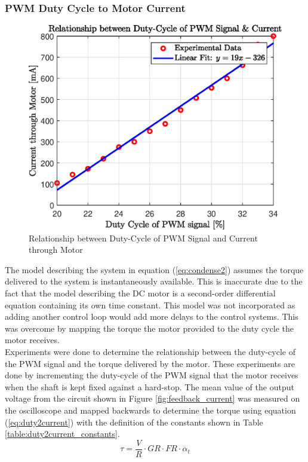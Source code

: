 \subsubsection{ PWM Duty Cycle to Motor Current}

\begin{figure}[h]
	\centering
	\includegraphics[scale=1]{./figs/dutycycle_vs_current.eps}
	\caption{Relationship between Duty-Cycle of PWM Signal and Current through Motor}
	\label{fig:dutycycle_vs_current}
\end{figure}

The model describing the system in equation (\ref{eq:condense2}) assumes the torque delivered to the system is instantaneously available. This is inaccurate due to the fact that the model describing the DC motor is a second-order differential equation containing its own time constant. This model was not incorporated as adding another control loop would add more delays to the control systems. This was overcome by mapping the torque the motor provided to the duty cycle the motor receives.\\

Experiments were done to determine the relationship between the duty-cycle of the PWM signal and the torque delivered by the motor. These experiments are done by incrementing the duty-cycle of the PWM signal that the motor receives when the shaft is kept fixed against a hard-stop. The mean value of the output voltage from the circuit shown in Figure \ref{fig:feedback_current} was measured on the oscilloscope and mapped backwards to determine the torque using equation (\ref{eq:duty2current}) with the definition of the constants shown in Table \ref{table:duty2current_constants}.
\begin{equation} \label{eq:duty2current}
\tau = \frac{V}{R}\cdot GR \cdot FR \cdot \alpha_{t}
\end{equation}

